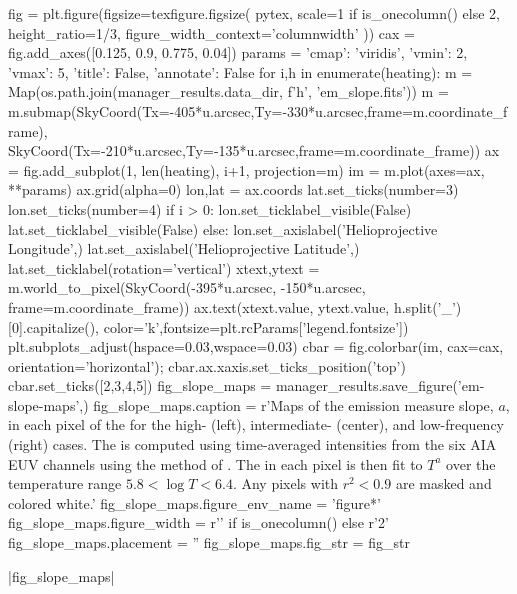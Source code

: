 \begin{pycode}
fig = plt.figure(figsize=texfigure.figsize(
    pytex,
    scale=1 if is_onecolumn() else 2,
    height_ratio=1/3,
    figure_width_context='columnwidth'
))
cax = fig.add_axes([0.125, 0.9, 0.775, 0.04])
params = {'cmap': 'viridis', 'vmin': 2, 'vmax': 5, 'title': False, 'annotate': False}
for i,h in enumerate(heating):
    m = Map(os.path.join(manager_results.data_dir, f'{h}', 'em_slope.fits'))
    m = m.submap(SkyCoord(Tx=-405*u.arcsec,Ty=-330*u.arcsec,frame=m.coordinate_frame),
                 SkyCoord(Tx=-210*u.arcsec,Ty=-135*u.arcsec,frame=m.coordinate_frame))
    ax = fig.add_subplot(1, len(heating), i+1, projection=m)
    im = m.plot(axes=ax, **params)
    ax.grid(alpha=0)
    lon,lat = ax.coords
    lat.set_ticks(number=3)
    lon.set_ticks(number=4)
    if i > 0:
        lon.set_ticklabel_visible(False)
        lat.set_ticklabel_visible(False)
    else:
        lon.set_axislabel('Helioprojective Longitude',)
        lat.set_axislabel('Helioprojective Latitude',)
        lat.set_ticklabel(rotation='vertical')
    xtext,ytext = m.world_to_pixel(SkyCoord(-395*u.arcsec, -150*u.arcsec, frame=m.coordinate_frame))
    ax.text(xtext.value, ytext.value, h.split('_')[0].capitalize(),
            color='k',fontsize=plt.rcParams['legend.fontsize'])
plt.subplots_adjust(hspace=0.03,wspace=0.03)
cbar = fig.colorbar(im, cax=cax, orientation='horizontal');
cbar.ax.xaxis.set_ticks_position('top')
cbar.set_ticks([2,3,4,5])
fig_slope_maps = manager_results.save_figure('em-slope-maps',)
fig_slope_maps.caption = r'Maps of the emission measure slope, $a$, in each pixel of the \AR{} for the high- (left), intermediate- (center), and low-frequency (right) cases. The \dem{} is computed using time-averaged intensities from the six AIA EUV channels using the method of \citet{hannah_differential_2012}. The \dem{} in each pixel is then fit to $T^a$ over the temperature range $5.8<\log{T}<6.4$. Any pixels with $r^2<0.9$ are masked and colored white.'
fig_slope_maps.figure_env_name = 'figure*'
fig_slope_maps.figure_width = r'\columnwidth' if is_onecolumn() else r'2\columnwidth'
fig_slope_maps.placement = ''
fig_slope_maps.fig_str = fig_str
\end{pycode}
|fig_slope_maps|

